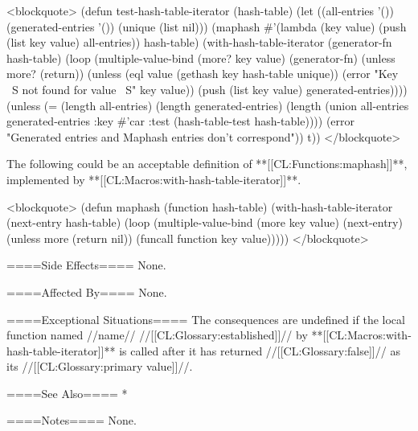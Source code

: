 <blockquote> (defun test-hash-table-iterator (hash-table) (let ((all-entries '()) (generated-entries '()) (unique (list nil))) (maphash #'(lambda (key value) (push (list key value) all-entries)) hash-table) (with-hash-table-iterator (generator-fn hash-table) (loop (multiple-value-bind (more? key value) (generator-fn) (unless more? (return)) (unless (eql value (gethash key hash-table unique)) (error "Key ~S not found for value ~S" key value)) (push (list key value) generated-entries)))) (unless (= (length all-entries) (length generated-entries) (length (union all-entries generated-entries :key #'car :test (hash-table-test hash-table)))) (error "Generated entries and Maphash entries don't correspond")) t)) </blockquote>

The following could be an acceptable definition of **[[CL:Functions:maphash]]**, implemented by **[[CL:Macros:with-hash-table-iterator]]**.

<blockquote> (defun maphash (function hash-table) (with-hash-table-iterator (next-entry hash-table) (loop (multiple-value-bind (more key value) (next-entry) (unless more (return nil)) (funcall function key value))))) </blockquote>

====Side Effects====
None.

====Affected By====
None.

====Exceptional Situations====
The consequences are undefined if the local function named //name// //[[CL:Glossary:established]]// by **[[CL:Macros:with-hash-table-iterator]]** is called after it has returned //[[CL:Glossary:false]]// as its //[[CL:Glossary:primary value]]//.

====See Also====
  * {\secref\TraversalRules}

====Notes====
None.

  

